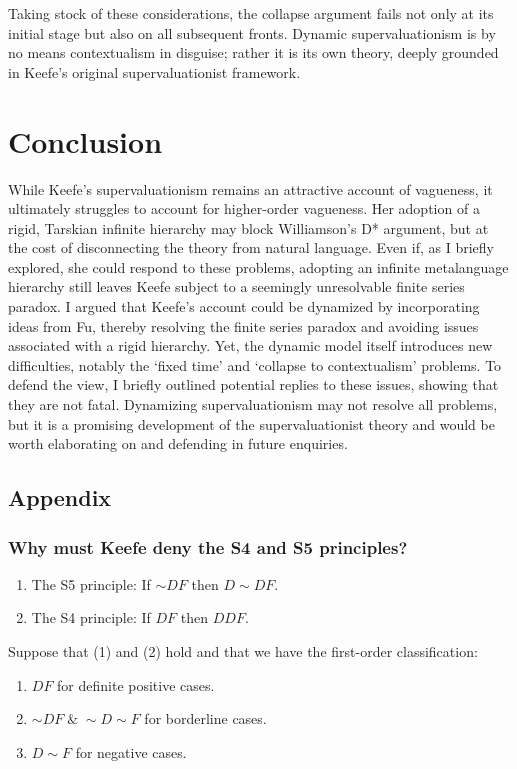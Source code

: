 Taking stock of these considerations, the collapse argument fails not
only at its initial stage but also on all subsequent fronts. Dynamic
supervaluationism is by no means contextualism in disguise; rather it is
its own theory, deeply grounded in Keefe's original supervaluationist
framework.

\section{Conclusion}

While Keefe's supervaluationism remains an attractive account of
vagueness, it ultimately struggles to account for higher-order
vagueness. Her adoption of a rigid, Tarskian infinite hierarchy may
block Williamson's D* argument, but at the cost of disconnecting the
theory from natural language. Even if, as I briefly explored, she could
respond to these problems, adopting an infinite metalanguage hierarchy
still leaves Keefe subject to a seemingly unresolvable finite series
paradox. I argued that Keefe's account could be dynamized by
incorporating ideas from Fu, thereby resolving the finite series paradox
and avoiding issues associated with a rigid hierarchy. Yet, the dynamic
model itself introduces new difficulties, notably the `fixed time' and
`collapse to contextualism' problems. To defend the view, I briefly
outlined potential replies to these issues, showing that they are not
fatal. Dynamizing supervaluationism may not resolve all problems, but it
is a promising development of the supervaluationist theory and would be
worth elaborating on and defending in future enquiries.

\subsection*{Appendix}

\subsubsection*{Why must Keefe deny the S4 and S5 principles?}

\begin{enumerate}
\def\labelenumi{(\arabic{enumi})}
\item The S5 principle: If ${\sim}DF$ then $D{\sim}DF$.
\item The S4 principle: If $DF$ then $DDF$. 
\end{enumerate}
Suppose that (1) and (2) hold and that we have the first-order
classification:
\begin{enumerate}
  \def\labelenumi{(\roman{enumi})}
\item{$DF$ for definite positive cases.}
\item{${\sim}DF \; \& \; {\sim}D{\sim}F$ for borderline cases.}
  \item{$D{\sim}F$ for negative cases.}
  \end{enumerate}

